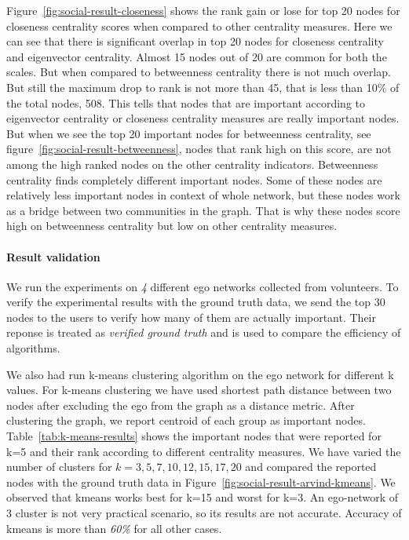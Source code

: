 Figure~\ref{fig:social-result-closeness} shows the rank gain or lose for
top 20 nodes for closeness centrality scores when compared to other
centrality measures.  Here we can see that there is significant
overlap in top 20 nodes for closeness centrality and eigenvector
centrality.  Almost 15 nodes out of 20 are common for both the scales.
But when compared to betweenness centrality there is not much overlap.
But still the maximum drop to rank is not more than 45, that is less
than 10\% of the total nodes, 508.  This tells
that nodes that are important according to eigenvector centrality or
closeness centrality measures are really important nodes.  But when we
see the top 20 important nodes for betweenness centrality, see
figure~\ref{fig:social-result-betweenness}, nodes that rank high on
this score, are not among the high ranked nodes on the other
centrality indicators.  Betweenness centrality finds completely
different important nodes.  Some of these nodes are relatively less
important nodes in context of whole network, but these nodes work as a
bridge between two communities in the graph.  That is why these nodes
score high on betweenness centrality but low on other centrality
measures.



\paragraph{Result validation}
We run the experiments on \emph{4} different ego networks collected
from volunteers.  To verify the experimental results with the ground
truth data, we send the top 30 nodes to the users to verify how many
of them are actually important.  Their reponse is treated as
\emph{verified ground truth} and is used to compare the efficiency of
algorithms.

We also had run k-means clustering algorithm on the ego network for
different k values.  For k-means clustering we have used shortest path
distance between two nodes after excluding the ego from the graph as a
distance metric.  After clustering the graph, we report centroid of
each group as important nodes.  Table~\ref{tab:k-means-results} shows
the important nodes that were reported for k=5 and their rank
according to different centrality measures.   We have varied the
number of clusters for $k=3,5,7,10,12,15,17,20$ and compared the
reported nodes with the ground truth data in
Figure~\ref{fig:social-result-arvind-kmeans}.  We observed that kmeans
works best for k=15 and worst for k=3.  An ego-network of 3 cluster is not
very practical scenario, so its results are not accurate.  Accuracy of
kmeans is more than \emph{60\%} for all other cases.


